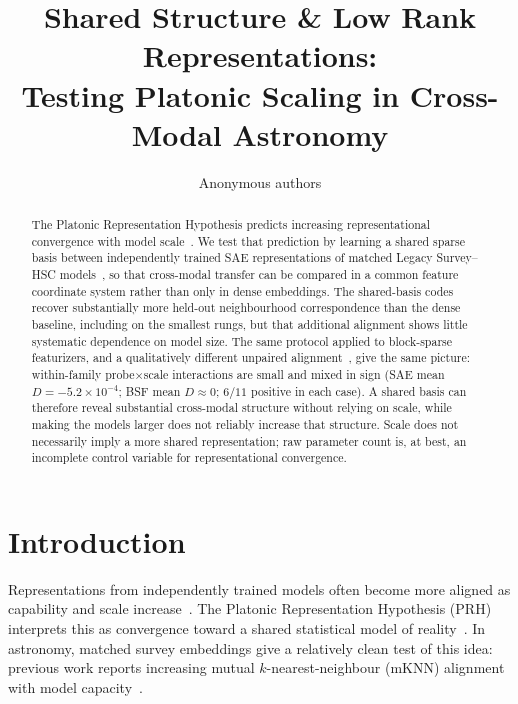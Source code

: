 \documentclass[11pt]{article}
\title{Shared Structure \& Low Rank Representations:\\
Testing Platonic Scaling in Cross-Modal Astronomy}
\author{Anonymous authors}
\date{}
\begin{document}
\maketitle

\begin{abstract}
The Platonic Representation Hypothesis predicts increasing representational convergence with model scale~\citep{huh2024platonic}.
We test that prediction by learning a shared sparse basis between independently trained SAE representations of matched Legacy Survey--HSC models~\citep{duraphe2025platonicuniverse}, so that cross-modal transfer can be compared in a common feature coordinate system rather than only in dense embeddings.
The shared-basis codes recover substantially more held-out neighbourhood correspondence than the dense baseline, including on the smallest rungs, but that additional alignment shows little systematic dependence on model size.
The same protocol applied to block-sparse featurizers, and a qualitatively different unpaired alignment~\citep{jha2025vec2vec}, give the same picture: within-family probe\(\times\)scale interactions are small and mixed in sign (SAE mean \(D{=}{-}5.2{\times}10^{-4}\); BSF mean \(D{\approx}0\); \(6/11\) positive in each case).
A shared basis can therefore reveal substantial cross-modal structure without relying on scale, while making the models larger does not reliably increase that structure.
Scale does not necessarily imply a more shared representation; raw parameter count is, at best, an incomplete control variable for representational convergence.
\end{abstract}

\section{Introduction}
\label{sec:intro}

Representations from independently trained models often become more aligned as capability and scale increase~\citep{huh2024platonic}.
The Platonic Representation Hypothesis (PRH) interprets this as convergence toward a shared statistical model of reality~\citep{huh2024platonic}.
In astronomy, matched survey embeddings give a relatively clean test of this idea: previous work reports increasing mutual \(k\)-nearest-neighbour (mKNN) alignment with model capacity~\citep{duraphe2025platonicuniverse}.
\end{document}

